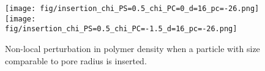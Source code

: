 \documentclass[10pt, a4paper]{article}
\begin{document}
\begin{figure}[htp!]
    \centering
    \texttt{[image: fig/insertion\_chi\_PS=0.5\_chi\_PC=0\_d=16\_pc=-26.png]}\\
    \hspace{0.5cm}
    \texttt{[image: fig/insertion\_chi\_PS=0.5\_chi\_PC=-1.5\_d=16\_pc=-26.png]}
    \caption{
        Non-local perturbation in polymer density when a particle with size comparable to pore radius is inserted. 
        }
    \label{fig:particle_insertion}
\end{figure}



\end{document}

